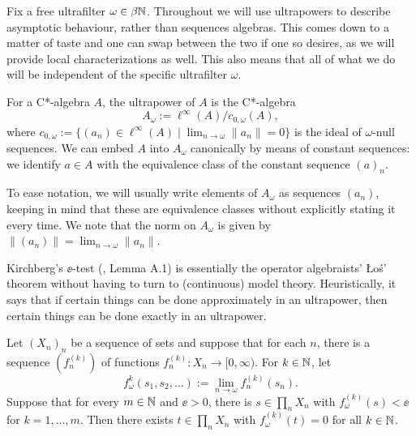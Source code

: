 \documentclass[12pt]{amsart}
\begin{document}
Fix a free ultrafilter $\omega \in \beta \mathbb{N}$. Throughout we will use ultrapowers to describe asymptotic behaviour, rather than sequences algebras. This comes down to a matter of taste and one can swap between the two if one so desires, as we will provide local characterizations as well. This also means that all of what we do will be independent of the specific ultrafilter $\omega$.

For a C*-algebra $A$, the ultrapower of $A$ is the C*-algebra
  \begin{equation}
 A_\omega := \ell^{\infty}(A)/c_{0,\omega}(A), 
  \end{equation}
where $c_{0,\omega} := \{(a_n) \in \ell^{\infty}(A) \mid \lim_{n \to \omega} \|a_n\| = 0\}$ is the ideal of $\omega$-null sequences. We can embed $A$ into $A_\omega$ canonically by means of constant sequences: we identify $a \in A$ with the equivalence class of the constant sequence $(a)_n$.

To ease notation, we will usually write elements of $A_\omega$ as sequences $(a_n)$, keeping in mind that these are equivalence classes without explicitly stating it every time. We note that the norm on $A_\omega$ is given by $\|(a_n)\| = \lim_{n \to \omega} \|a_n\|$. 

Kirchberg's $\ee$-test (\cite{Kirchberg06}, Lemma A.1) is essentially the operator algebraists' {\L}o{\' s}' theorem without having to turn to (continuous) model theory. Heuristically, it says that if certain things can be done approximately in an ultrapower, then certain things can be done exactly in an ultrapower.

\begin{lemma}\label{lemma:Kirchberg-eptest}
Let $(X_n)_n$ be a sequence of sets and suppose that for each $n$, there is a sequence $(f_n^{(k)})$ of functions $f_n^{(k)}: X_n \to [0,\infty)$. For $k \in \mathbb{N}$, let
\begin{equation}
f_\omega^k(s_1,s_2,\dots) := \lim_{n \to \omega} f_n^{(k)}(s_n). 
\end{equation}
Suppose that for every $m \in \mathbb{N}$ and $\ee > 0$, there is $s \in \prod_n X_n$ with $f_\omega^{(k)}(s) < \ee$ for $k=1,\dots,m$. Then there exists $t \in \prod_nX_n$ with $f_\omega^{(k)}(t) = 0$ for all $k \in \mathbb{N}$. 

\end{lemma}
\end{document}

